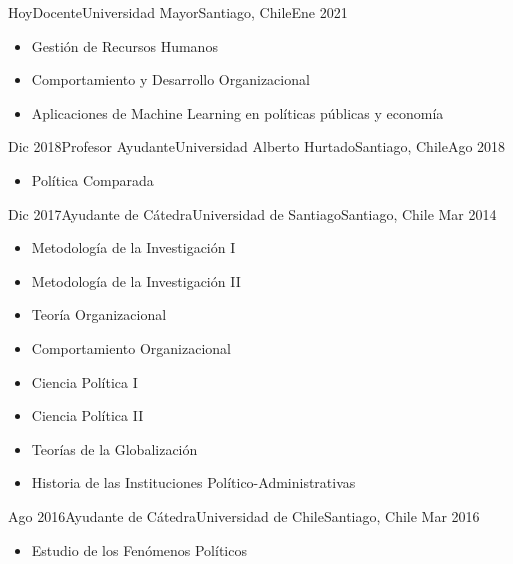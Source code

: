 





\begin{experiences}
  \experience
    {Hoy}{Docente}{Universidad Mayor}{Santiago, Chile}{Ene 2021}
    {\begin{itemize}
    \item Gestión de Recursos Humanos
    \item Comportamiento y Desarrollo Organizacional
    \item Aplicaciones de Machine Learning en políticas públicas y economía
    \end{itemize}}
    {}
\end{experiences}
\vspace{-2mm}

\begin{experiences}
  \experience
    {Dic 2018}{Profesor Ayudante}{Universidad Alberto Hurtado}{Santiago, Chile}{Ago 2018}
    {\begin{itemize}
    \item Política Comparada
    \end{itemize}}
    {}
\end{experiences}
\vspace{-2mm}

\begin{experiences}
  \emptySeparator 
  \experience 
    {Dic 2017}{Ayudante de Cátedra}{Universidad de Santiago}{Santiago, Chile} {Mar 2014}
    {\begin{itemize}
    \item Metodología de la Investigación I
    \item Metodología de la Investigación II
    \item Teoría Organizacional
    \item Comportamiento Organizacional
    \item Ciencia Política I
    \item Ciencia Política II
    \item Teorías de la Globalización
    \item Historia de las Instituciones Político-Administrativas
    \end{itemize}}
    {}
\end{experiences}
\vspace{-2mm}

\begin{experiences}
  \emptySeparator 
  \experience 
    {Ago 2016}{Ayudante de Cátedra}{Universidad de Chile}{Santiago, Chile} {Mar 2016}
    {\begin{itemize}
    \item Estudio de los Fenómenos Políticos
    \end{itemize}}
    {}
\end{experiences}
